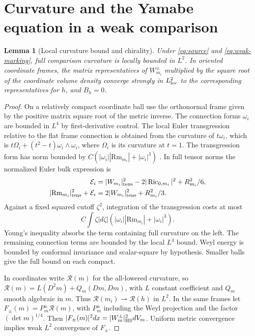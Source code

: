 \documentclass[11pt]{article}
\newtheorem{lemma}[theorem]{Lemma}
\theoremstyle{definition}
\theoremstyle{remark}
\begin{document}


\section{Curvature and the Yamabe equation in a weak comparison}

\begin{lemma}[Local curvature bound and chirality]\label{lem:weyl}
Under \eqref{eq:source} and \eqref{eq:weak-marking}, full comparison curvature is locally bounded in \(L^2\). In oriented coordinate frames, the matrix representatives of \(W_{m_i}^\pm\) multiplied by the square root of the coordinate volume density converge strongly in \(L^2_{\rm loc}\) to the corresponding representatives for \(h\), and \(B_h=0\).
\end{lemma}
\begin{proof}
On a relatively compact coordinate ball use the orthonormal frame given by the positive matrix square root of the metric inverse. The connection forms \(\omega_i\) are bounded in \(L^4\) by first-derivative control. The local Euler transgression relative to the flat frame connection is obtained from the curvature of \(t\omega_i\), which is \(t\Omega_i+(t^2-t)\omega_i\wedge\omega_i\), where \(\Omega_i\) is its curvature at \(t=1\). The transgression form has norm bounded by \(C(|\omega_i||\mathrm{Rm}_{m_i}|+|\omega_i|^3)\) \cite[\S3]{ChernSimons1974Characteristic}. In full tensor norms the normalized Euler bulk expression is
\[
 \begin{aligned}
 \mathcal E_i&=|W_{m_i}|_{\rm tens}^2-2|\operatorname{Ric}_{0,m_i}|^2+R_{m_i}^2/6,\\
 |\mathrm{Rm}_{m_i}|_{\rm tens}^2+\mathcal E_i&=2|W_{m_i}|_{\rm tens}^2+R_{m_i}^2/3 .
 \end{aligned}
\]
Against a fixed squared cutoff \(\zeta^2\), integration of the transgression costs at most
\[
 C\int\zeta |d\zeta|(|\omega_i||\mathrm{Rm}_{m_i}|+|\omega_i|^3).
\] Young's inequality absorbs the term containing full curvature on the left. The remaining connection terms are bounded by the local \(L^4\) bound. Weyl energy is bounded by conformal invariance and scalar-square by hypothesis. Smaller balls give the full bound on each compact.

In coordinates write \(\mathcal R(m)\) for the all-lowered curvature, so \(\mathcal R(m)=L(D^2m)+Q_m(Dm,Dm)\), with \(L\) constant coefficient and \(Q_m\) smooth algebraic in \(m\). Thus \(\mathcal R(m_i)\rightharpoonup\mathcal R(h)\) in \(L^2\). In the same frames let \(F_\pm(m)=P^\pm_m\mathcal R(m)\), with \(P^\pm_m\) including the Weyl projection and the factor \((\det m)^{1/4}\). Then \(|F_\pm(m)|^2dx=|W_m^\pm|^2_{\rm HS}dV_m\). Uniform metric convergence implies weak \(L^2\) convergence of \(F_\pm\).


\end{proof}
\end{document}
